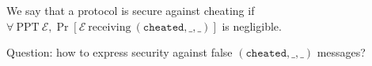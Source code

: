 \begin{definition}
\label{def:cheatsec}
  We say that a protocol is secure against cheating if $\forall \: \mathrm{PPT} \:
  \mathcal{E}, \Pr\left[\mathcal{E} \: \mathrm{receiving} \: \left(\mathtt{cheated, \_,
  \_}\right)\right]$ is negligible.
\end{definition}
Question: how to express security against false $\left(\mathtt{cheated, \_, \_}\right)$
messages?
